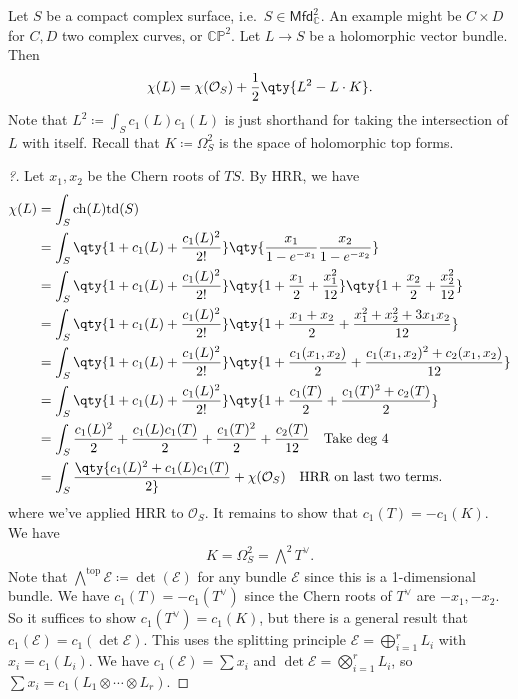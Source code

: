 \begin{proposition}[?]

Let \(S\) be a compact complex surface,
i.e.~\(S\in {\mathsf{Mfd}}_{\mathbb{C}}^2\). An example might be
\(C\times D\) for \(C,D\) two complex curves, or \({\mathbb{CP}}^2\).
Let \(L\to S\) be a holomorphic vector bundle. Then
\begin{align*}
\chi(L) = \chi({\mathcal{O}}_S) + {1\over 2} \qty{ L^2 - L \cdot K}
.\end{align*}
Note that \(L^2 \coloneqq\int_S c_1(L) c_1(L)\) is just shorthand for
taking the intersection of \(L\) with itself. Recall that
\(K \coloneqq\Omega_S^2\) is the space of holomorphic top forms.

\end{proposition}

\begin{proof}[?]

Let \(x_1, x_2\) be the Chern roots of \(TS\). By HRR, we have
\begin{align*}
\chi(L) 
&= \int_S \operatorname{ch}(L) \mathrm{td}(S) \\
&= \int_S \qty{ 1 + c_1(L) + {c_1(L)^2 \over 2!} } \qty{ {x_1 \over 1 - e^{-x_1} } {x_2 \over 1-e^{-x_2}} }\\
&= \int_S \qty{ 1 + c_1(L) + {c_1(L)^2 \over 2!} } \qty{1 + {x_1 \over 2} + {x_1^2 \over 12} }\qty{ 1 + {x_2 \over 2} + {x_2^2\over 12}} \\
&= \int_S \qty{ 1 + c_1(L) + {c_1(L)^2 \over 2!} } \qty{1 + {x_1 + x_2 \over 2} + {x_1^2 + x_2^2 + 3x_1 x_2 \over 12} } \\
&= \int_S \qty{ 1 + c_1(L) + {c_1(L)^2 \over 2!} } \qty{1 + {c_1(x_1, x_2) \over 2} + {c_1(x_1, x_2)^2 + c_2(x_1, x_2) \over 12 } } \\
&= \int_S \qty{ 1 + c_1(L) + {c_1(L)^2 \over 2!} } \qty{1 + { c_1(T) \over 2} + {c_1(T)^2 + c_2(T) \over 2 } } \\
&= \int_S {c_1(L)^2 \over 2} + {c_1(L) c_1(T) \over 2} + {c_1(T)^2 \over 2} + {c_2(T) \over 12} \quad \text{Take deg 4} \\
&= \int_S \qty{ c_1(L)^2 + c_1(L) c_1(T) \over 2} + \chi({\mathcal{O}}_S) \quad \text{HRR on last two terms}
.\end{align*}
where we've applied HRR to \({\mathcal{O}}_S\). It remains to show that
\(c_1(T) = -c_1(K)\). We have
\begin{align*}
K = \Omega_S^2 = \bigwedge\nolimits^2 T^\vee
.\end{align*}
Note that
\(\bigwedge\nolimits^{\text{top}} \mathcal{E} \coloneqq\det( \mathcal{E} )\)
for any bundle \(\mathcal{E}\) since this is a 1-dimensional bundle. We
have \(c_1(T) = -c_1(T^\vee)\) since the Chern roots of \(T^\vee\) are
\(-x_1, -x_2\). So it suffices to show \(c_1(T^\vee) = c_1(K)\), but
there is a general result that
\(c_1(\mathcal{E}) = c_1( \det \mathcal{E} )\). This uses the splitting
principle \(\mathcal{E} = \bigoplus_{i=1}^r L_i\) with
\(x_i = c_1(L_i)\). We have \(c_1(\mathcal{E}) = \sum x_i\) and
\(\det\mathcal{E} = \bigotimes_{i=1}^r L_i\), so
\(\sum x_i = c_1(L_1\otimes\cdots \otimes L_r)\).

\end{proof}

